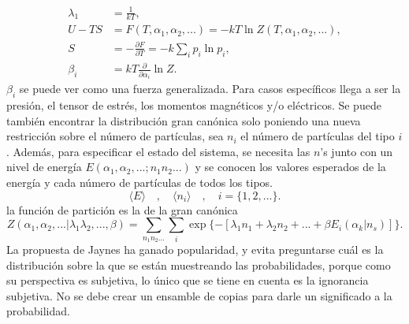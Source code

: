 \begin{align*}
\lambda_{1} &=\frac{1}{kT}, \\
U-TS &= F(T,\alpha_{1},\alpha_{2},...)=-kT \ln Z(T,\alpha_{1},\alpha_{2},...), \\
S &= -\frac{\partial F}{\partial T}=-k\sum_{i} p_{i} \ln p_{i}, \\
\beta_{i} &= kT \frac{\partial }{\partial \alpha_{i}} \ln Z.
\end{align*}
$\beta_{i}$ se puede ver como una fuerza generalizada. Para casos específicos llega a ser la presión, el tensor de estrés, los momentos magnéticos y/o  eléctricos. Se puede también encontrar la distribución gran canónica solo poniendo una nueva restricción sobre el número de partículas, sea $n_{i}$ el número de partículas del tipo $i$. Además, para especificar el estado del sistema, se necesita las $n$'s junto con un nivel de energía $E(\alpha_{1},\alpha_{2},...;n_{1}n_{2}...)$ y se conocen los valores esperados de la energía y cada número de partículas de todos los tipos.
\begin{equation}
\langle E \rangle \quad , \quad \langle n_{i} \rangle \quad , \quad i=  \{ 1,2,... \}.
\end{equation}
la función de partición es la de la gran canónica
\begin{equation}
Z(\alpha_{1},\alpha_{2},...|\lambda_{1} \lambda_{2} ,...,\beta )= \sum_{n_{1} n_{2}...} \sum_{i} \exp \{ -[ \lambda_{1} n_{1}+\lambda_{2} n_{2}+...+\beta E_{i} (\alpha_{k} | n_{s} ) ] \}.
\end{equation}
La propuesta de Jaynes ha ganado popularidad, y evita preguntarse cuál es la distribución sobre la que se están muestreando las probabilidades, porque como su perspectiva es subjetiva, lo único que se tiene en cuenta es la ignorancia subjetiva. No se debe crear un ensamble de copias para darle un significado a la probabilidad.



